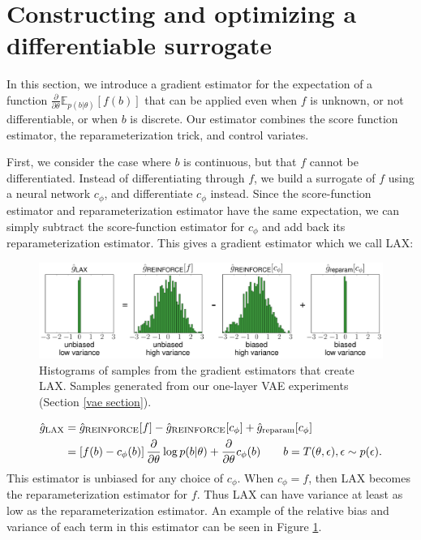\documentclass{article}
\newcommand{\E}{\mathbb{E}}
\newcommand{\PT}{\frac{\partial}{\partial \theta}}
\newcommand{\LAX}{{\textnormal{LAX}}}
\begin{document}
\section{Constructing and optimizing a differentiable surrogate}
\label{lax section}
In this section, we introduce a gradient estimator for the expectation of a function $\PT \E_{p(b|\theta)}[f(b)]$ that can be applied even when $f$ is unknown, or not differentiable, or when $b$ is discrete.
Our estimator combines the score function estimator, the reparameterization trick, and control variates.

First, we consider the case where $b$ is continuous, but that $f$ cannot be differentiated.
Instead of differentiating through $f$, we build a surrogate of $f$ using a neural network $c_\phi$, and differentiate $c_\phi$ instead.
Since the score-function estimator and reparameterization estimator have the same expectation,
we can simply subtract the score-function estimator for $c_\phi$ and add back its reparameterization estimator.
This gives a gradient estimator which we call LAX:
\begin{figure}[b]
\includegraphics[width=\columnwidth]{figures/grad_hist.pdf}
\caption{Histograms of samples from the gradient estimators that create LAX. Samples generated from our one-layer VAE experiments (Section \ref{vae section}).}
\label{fig:grad hist}
\end{figure}
%
\begin{align}
\label{eq:cont_est}
\hat g_\LAX &= 
\hat{g}_\textnormal{REINFORCE}[f] - \hat{g}_\textnormal{REINFORCE}[c_\phi] + \hat{g}_\textnormal{reparam}[c_\phi] \nonumber\\
&= \left[ f(b) -c_\phi(b) \right] \PT \log p(b|\theta) + \PT c_\phi(b) \qquad b = T(\theta, \epsilon), \epsilon \sim p(\epsilon).
\end{align}
%
This estimator is unbiased for any choice of $c_\phi$.
When $c_\phi = f$, then \LAX{} becomes the reparameterization estimator for $f$.
Thus \LAX{} can have variance at least as low as the reparameterization estimator. An example of the relative bias and variance of each term in this estimator can be seen in Figure \ref{fig:grad hist}.
\end{document}
